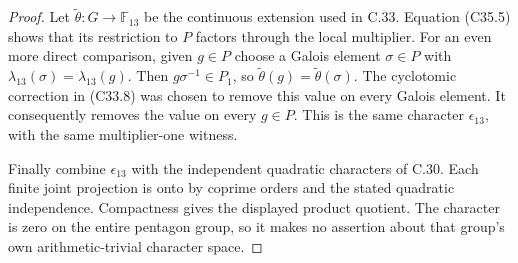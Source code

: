 \begin{proof}
Let $\widetilde\theta:G\to\mathbb F_{13}$ be the
continuous extension used in C.33.  Equation (C35.5)
shows that its restriction to $P$ factors through
the local multiplier.
For an even more direct comparison, given $g\in P$
choose a Galois element $\sigma\in P$ with
$\lambda_{13}(\sigma)=\lambda_{13}(g)$.
Then $g\sigma^{-1}\in P_1$, so
$\widetilde\theta(g)=\widetilde\theta(\sigma)$.
The cyclotomic correction in (C33.8) was chosen to
remove this value on every Galois element.
It consequently removes the value on every $g\in P$.
This is the same character $\epsilon_{13}$,
with the same multiplier-one witness.

Finally combine $\epsilon_{13}$ with the independent
quadratic characters of C.30.  Each finite joint
projection is onto by coprime orders and the stated
quadratic independence.  Compactness gives the displayed
product quotient.  The character is zero on the entire
pentagon group, so it makes no assertion about that
group's own arithmetic-trivial character space.
\end{proof}


